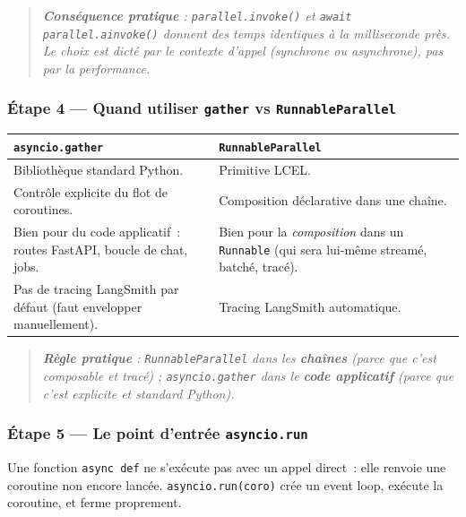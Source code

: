 \documentclass[11pt,a4paper]{article}
\begin{document}
\begin{quote}\itshape
\textbf{Conséquence pratique} : \texttt{parallel.invoke()} et
\texttt{await parallel.ainvoke()} donnent des temps \emph{identiques} à
la milliseconde près. Le choix est dicté par le contexte d'appel
(synchrone ou asynchrone), pas par la performance.
\end{quote}

\subsubsection*{Étape 4 — Quand utiliser \texttt{gather} vs \texttt{RunnableParallel}}

\begin{center}
\begin{tabular}{p{6.5cm} p{6.5cm}}
\toprule
\textbf{\texttt{asyncio.gather}} & \textbf{\texttt{RunnableParallel}} \\
\midrule
Bibliothèque standard Python.   & Primitive LCEL. \\[1mm]
Contrôle explicite du flot de coroutines.
& Composition déclarative dans une chaîne. \\[1mm]
Bien pour du code applicatif~: routes FastAPI, boucle de chat, jobs.
& Bien pour la \emph{composition} dans un \texttt{Runnable} (qui sera lui-même streamé, batché, tracé). \\[1mm]
Pas de tracing LangSmith par défaut (faut envelopper manuellement).
& Tracing LangSmith automatique. \\
\bottomrule
\end{tabular}
\end{center}

\begin{quote}\itshape\sloppy
\textbf{Règle pratique} : \texttt{RunnableParallel} dans les
\textbf{chaînes} (parce que c'est composable et tracé) ;
\texttt{asyncio.gather} dans le \textbf{code applicatif} (parce que
c'est explicite et standard Python).
\end{quote}

\subsubsection*{Étape 5 — Le point d'entrée \texttt{asyncio.run}}

Une fonction \texttt{async def} ne s'exécute pas avec un appel direct~:
elle renvoie une coroutine non encore lancée. \texttt{asyncio.run(coro)}
crée un event loop, exécute la coroutine, et ferme proprement.
\end{document}
